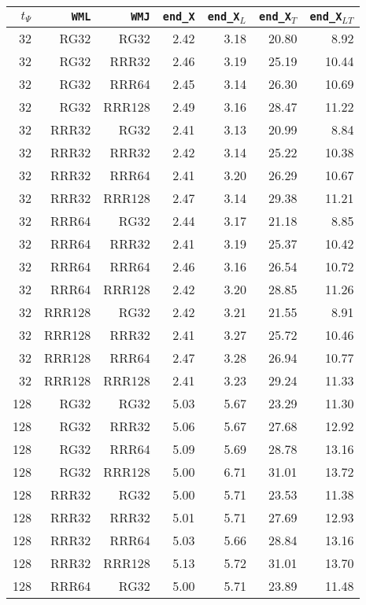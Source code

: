 \begin{table}
\begin{tabular}{|r|r|r|r|r|r|r|}
\hline
$t_{\Psi}$ & \texttt{WML} & \texttt{WMJ} & \texttt{end\_X} & \texttt{end\_X$_{L}$} & \texttt{end\_X$_{T}$} & \texttt{end\_X$_{LT}$} \\
\hline
32 & RG32 & RG32 & 2.42 & 3.18 & 20.80 & 8.92 \\
32 & RG32 & RRR32 & 2.46 & 3.19 & 25.19 & 10.44 \\
32 & RG32 & RRR64 & 2.45 & 3.14 & 26.30 & 10.69 \\
32 & RG32 & RRR128 & 2.49 & 3.16 & 28.47 & 11.22 \\
32 & RRR32 & RG32 & 2.41 & 3.13 & 20.99 & 8.84 \\
32 & RRR32 & RRR32 & 2.42 & 3.14 & 25.22 & 10.38 \\
32 & RRR32 & RRR64 & 2.41 & 3.20 & 26.29 & 10.67 \\
32 & RRR32 & RRR128 & 2.47 & 3.14 & 29.38 & 11.21 \\
32 & RRR64 & RG32 & 2.44 & 3.17 & 21.18 & 8.85 \\
32 & RRR64 & RRR32 & 2.41 & 3.19 & 25.37 & 10.42 \\
32 & RRR64 & RRR64 & 2.46 & 3.16 & 26.54 & 10.72 \\
32 & RRR64 & RRR128 & 2.42 & 3.20 & 28.85 & 11.26 \\
32 & RRR128 & RG32 & 2.42 & 3.21 & 21.55 & 8.91 \\
32 & RRR128 & RRR32 & 2.41 & 3.27 & 25.72 & 10.46 \\
32 & RRR128 & RRR64 & 2.47 & 3.28 & 26.94 & 10.77 \\
32 & RRR128 & RRR128 & 2.41 & 3.23 & 29.24 & 11.33 \\
128 & RG32 & RG32 & 5.03 & 5.67 & 23.29 & 11.30 \\
128 & RG32 & RRR32 & 5.06 & 5.67 & 27.68 & 12.92 \\
128 & RG32 & RRR64 & 5.09 & 5.69 & 28.78 & 13.16 \\
128 & RG32 & RRR128 & 5.00 & 6.71 & 31.01 & 13.72 \\
128 & RRR32 & RG32 & 5.00 & 5.71 & 23.53 & 11.38 \\
128 & RRR32 & RRR32 & 5.01 & 5.71 & 27.69 & 12.93 \\
128 & RRR32 & RRR64 & 5.03 & 5.66 & 28.84 & 13.16 \\
128 & RRR32 & RRR128 & 5.13 & 5.72 & 31.01 & 13.70 \\
128 & RRR64 & RG32 & 5.00 & 5.71 & 23.89 & 11.48 \\

\end{tabular}
\end{table}
